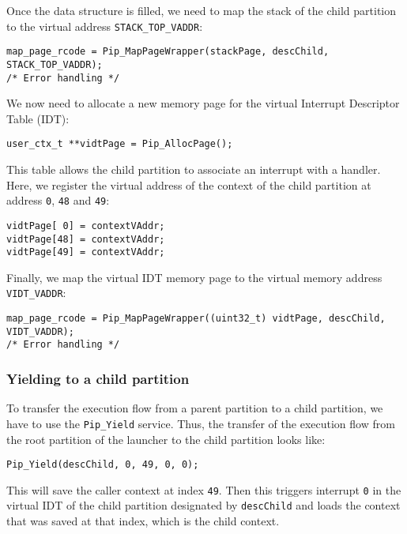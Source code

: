 \documentclass[10pt,a4paper,titlepage]{refart}
\begin{document}
Once the data structure is filled, we need to map the stack of the child
partition to the virtual address \texttt{STACK\_TOP\_VADDR}:

\begin{lstlisting}[style=CStyle]
map_page_rcode = Pip_MapPageWrapper(stackPage, descChild, STACK_TOP_VADDR);
/* Error handling */
\end{lstlisting}

We now need to allocate a new memory page for the virtual Interrupt Descriptor
Table (IDT):

\begin{lstlisting}[style=CStyle]
user_ctx_t **vidtPage = Pip_AllocPage();
\end{lstlisting}

This table allows the child partition to associate an interrupt with a handler.
Here, we register the virtual address of the context of the child partition at
address \texttt{0}, \texttt{48} and \texttt{49}:

\begin{lstlisting}[style=CStyle]
vidtPage[ 0] = contextVAddr;
vidtPage[48] = contextVAddr;
vidtPage[49] = contextVAddr;
\end{lstlisting}

Finally, we map the virtual IDT memory page to the virtual memory address
\texttt{VIDT\_VADDR}:

\begin{lstlisting}[style=CStyle]
map_page_rcode = Pip_MapPageWrapper((uint32_t) vidtPage, descChild, VIDT_VADDR);
/* Error handling */
\end{lstlisting}

\subsubsection{Yielding to a child partition}

To transfer the execution flow from a parent partition to a child partition, we
have to use the \texttt{Pip\_Yield} service. Thus, the transfer of the execution
flow from the root partition of the launcher to the child partition looks like:

\begin{lstlisting}[style=CStyle]
Pip_Yield(descChild, 0, 49, 0, 0);
\end{lstlisting}

This will save the caller context at index \texttt{49}. Then this triggers
interrupt \texttt{0} in the virtual IDT of the child partition designated by
\texttt{descChild} and loads the context that was saved at that index, which is
the child context.
\end{document}
